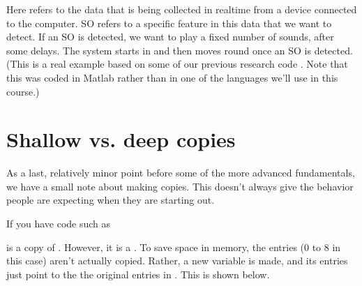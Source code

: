 \documentclass[letterpaper,10pt,british]{sphinxmanual}
\let\sphinxpxdimen\pdfpxdimen\else\newdimen\sphinxpxdimen
\begin{document}
\begin{figure}[htbp]
\centering

\noindent\sphinxincludegraphics[width=800\sphinxpxdimen]{{state_diagram}.png}
\end{figure}

\sphinxAtStartPar
Here  refers to the data that is being collected in real\sphinxhyphen{}time from a device connected to the computer. SO refers to a specific feature in this data that we want to detect. If an SO is detected, we want to play a fixed number of sounds, after some delays. The system starts in  and then moves round once an SO is detected. (This is a real example based on some of our previous research code . Note that this was coded in Matlab rather than in one of the languages we’ll use in this course.)

\sphinxstepscope


\section{Shallow vs. deep copies}
\label{\detokenize{chapters/programming_fundamentals/copies:shallow-vs-deep-copies}}\label{\detokenize{chapters/programming_fundamentals/copies::doc}}
\sphinxAtStartPar
As a last, relatively minor point before some of the more advanced fundamentals, we have a small note about making copies. This doesn’t always give the behavior people are expecting when they are starting out.

\sphinxAtStartPar
If you have code such as

\begin{sphinxVerbatim}[commandchars=\\\{\}]
  \PYG{p}{[}\PYG{p}{[}  \PYG{p}{]} \PYG{p}{[}  \PYG{p}{]} \PYG{p}{[}  \PYG{p}{]}\PYG{p}{]}
  
\end{sphinxVerbatim}

\sphinxAtStartPar
{} is a copy of . However, it is a . To save space in memory, the entries (0 to 8 in this case) aren’t actually copied. Rather, a new variable  is made, and its entries just point to the the original entries in . This is shown below.
\end{document}

